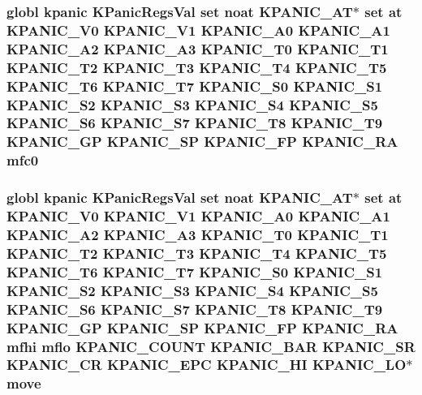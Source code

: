\hypertarget{mips_2kpanica_8S_aa5e134db09e219cd8c7c627cf9cc1c79}{
\subsubsection[{mfc0}]{\setlength{\rightskip}{0pt plus 5cm}globl {\bf kpanic} {\bf K\-Panic\-Regs\-Val} set noat {\bf K\-P\-A\-N\-I\-C\-\_\-\-A\-T}$\ast$ set at {\bf K\-P\-A\-N\-I\-C\-\_\-\-V0} {\bf K\-P\-A\-N\-I\-C\-\_\-\-V1} {\bf K\-P\-A\-N\-I\-C\-\_\-\-A0} {\bf K\-P\-A\-N\-I\-C\-\_\-\-A1} {\bf K\-P\-A\-N\-I\-C\-\_\-\-A2} {\bf K\-P\-A\-N\-I\-C\-\_\-\-A3} {\bf K\-P\-A\-N\-I\-C\-\_\-\-T0} {\bf K\-P\-A\-N\-I\-C\-\_\-\-T1} {\bf K\-P\-A\-N\-I\-C\-\_\-\-T2} {\bf K\-P\-A\-N\-I\-C\-\_\-\-T3} {\bf K\-P\-A\-N\-I\-C\-\_\-\-T4} {\bf K\-P\-A\-N\-I\-C\-\_\-\-T5} {\bf K\-P\-A\-N\-I\-C\-\_\-\-T6} {\bf K\-P\-A\-N\-I\-C\-\_\-\-T7} {\bf K\-P\-A\-N\-I\-C\-\_\-\-S0} {\bf K\-P\-A\-N\-I\-C\-\_\-\-S1} {\bf K\-P\-A\-N\-I\-C\-\_\-\-S2} {\bf K\-P\-A\-N\-I\-C\-\_\-\-S3} {\bf K\-P\-A\-N\-I\-C\-\_\-\-S4} {\bf K\-P\-A\-N\-I\-C\-\_\-\-S5} {\bf K\-P\-A\-N\-I\-C\-\_\-\-S6} {\bf K\-P\-A\-N\-I\-C\-\_\-\-S7} {\bf K\-P\-A\-N\-I\-C\-\_\-\-T8} {\bf K\-P\-A\-N\-I\-C\-\_\-\-T9} {\bf K\-P\-A\-N\-I\-C\-\_\-\-G\-P} {\bf K\-P\-A\-N\-I\-C\-\_\-\-S\-P} {\bf K\-P\-A\-N\-I\-C\-\_\-\-F\-P} {\bf K\-P\-A\-N\-I\-C\-\_\-\-R\-A} mfc0}}\label{mips_2kpanica_8S_aa5e134db09e219cd8c7c627cf9cc1c79}
\hypertarget{mips_2kpanica_8S_a4403441095126a749196190182754145}{
\subsubsection[{move}]{\setlength{\rightskip}{0pt plus 5cm}globl {\bf kpanic} {\bf K\-Panic\-Regs\-Val} set noat {\bf K\-P\-A\-N\-I\-C\-\_\-\-A\-T}$\ast$ set at {\bf K\-P\-A\-N\-I\-C\-\_\-\-V0} {\bf K\-P\-A\-N\-I\-C\-\_\-\-V1} {\bf K\-P\-A\-N\-I\-C\-\_\-\-A0} {\bf K\-P\-A\-N\-I\-C\-\_\-\-A1} {\bf K\-P\-A\-N\-I\-C\-\_\-\-A2} {\bf K\-P\-A\-N\-I\-C\-\_\-\-A3} {\bf K\-P\-A\-N\-I\-C\-\_\-\-T0} {\bf K\-P\-A\-N\-I\-C\-\_\-\-T1} {\bf K\-P\-A\-N\-I\-C\-\_\-\-T2} {\bf K\-P\-A\-N\-I\-C\-\_\-\-T3} {\bf K\-P\-A\-N\-I\-C\-\_\-\-T4} {\bf K\-P\-A\-N\-I\-C\-\_\-\-T5} {\bf K\-P\-A\-N\-I\-C\-\_\-\-T6} {\bf K\-P\-A\-N\-I\-C\-\_\-\-T7} {\bf K\-P\-A\-N\-I\-C\-\_\-\-S0} {\bf K\-P\-A\-N\-I\-C\-\_\-\-S1} {\bf K\-P\-A\-N\-I\-C\-\_\-\-S2} {\bf K\-P\-A\-N\-I\-C\-\_\-\-S3} {\bf K\-P\-A\-N\-I\-C\-\_\-\-S4} {\bf K\-P\-A\-N\-I\-C\-\_\-\-S5} {\bf K\-P\-A\-N\-I\-C\-\_\-\-S6} {\bf K\-P\-A\-N\-I\-C\-\_\-\-S7} {\bf K\-P\-A\-N\-I\-C\-\_\-\-T8} {\bf K\-P\-A\-N\-I\-C\-\_\-\-T9} {\bf K\-P\-A\-N\-I\-C\-\_\-\-G\-P} {\bf K\-P\-A\-N\-I\-C\-\_\-\-S\-P} {\bf K\-P\-A\-N\-I\-C\-\_\-\-F\-P} {\bf K\-P\-A\-N\-I\-C\-\_\-\-R\-A} mfhi mflo {\bf K\-P\-A\-N\-I\-C\-\_\-\-C\-O\-U\-N\-T} {\bf K\-P\-A\-N\-I\-C\-\_\-\-B\-A\-R} {\bf K\-P\-A\-N\-I\-C\-\_\-\-S\-R} {\bf K\-P\-A\-N\-I\-C\-\_\-\-C\-R} {\bf K\-P\-A\-N\-I\-C\-\_\-\-E\-P\-C} {\bf K\-P\-A\-N\-I\-C\-\_\-\-H\-I} {\bf K\-P\-A\-N\-I\-C\-\_\-\-L\-O}$\ast$ move}}\label{mips_2kpanica_8S_a4403441095126a749196190182754145}
